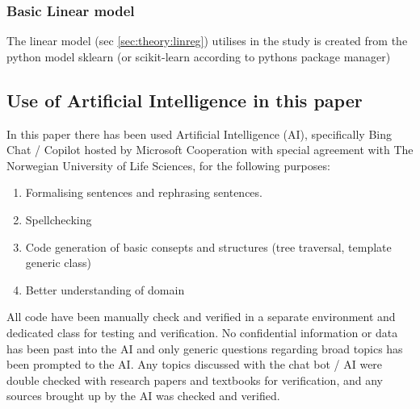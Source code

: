 \subsubsection{Basic Linear model}

The linear model (sec \ref{sec:theory:linreg}) utilises in the study is created from the python model sklearn (or scikit-learn according to pythons package manager) 

\subsection[Use of AI]{Use of Artificial Intelligence in this paper}

In this paper there has been used Artificial Intelligence (AI), specifically Bing Chat / Copilot hosted by Microsoft Cooperation with special agreement with The Norwegian University of Life Sciences, for the following purposes:

\begin{enumerate}
	\item Formalising sentences and rephrasing sentences.
	\item Spellchecking
	\item Code generation of basic consepts and structures (tree traversal, template generic class) 
	\item Better understanding of domain
\end{enumerate}

All code have been manually check and verified in a separate environment and dedicated class for testing and verification. No confidential information or data has been past into the AI and only generic questions regarding broad topics has been prompted to the AI. Any topics discussed with the chat bot / AI were double checked with research papers and textbooks for verification, and any sources brought up by the AI was checked and verified.
